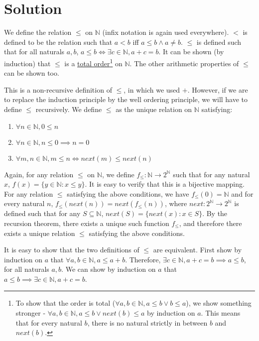 \documentclass[12pt]{report}
\begin{document}
\section*{Solution}
We define the relation $\leq$ on $\mathbb{N}$ (infix notation is again used everywhere). $<$ is defined to be the relation such that $a < b$ iff $a \leq b \land a \neq b$. $\leq$ is defined such that for all naturals $a, b$, $a \leq b \iff \exists c \in \mathbb{N}, a + c = b$. It can be shown (by induction) that $\leq$ is a \href{https://en.wikipedia.org/wiki/Total_order}{total order}\footnote{To show that the order is total ($\forall a, b \in \mathbb{N}, a \leq b \lor b \leq a$), we show something stronger - $\forall a, b \in \mathbb{N}, a \leq b \lor next(b) \leq a$ by induction on $a$. This means that for every natural $b$, there is no natural strictly in between $b$ and $next(b)$.} on $\mathbb{N}$. The other arithmetic properties of $\leq$ can be shown too. 

This is a non-recursive definition of $\leq$, in which we used $+$. However, if we are to replace the induction principle by the well ordering principle, we will have to define $\leq$ recursively. We define $\leq$ as the unique relation on $\mathbb{N}$ satisfying:
\begin{enumerate}
  \item $\forall n \in \mathbb{N}, 0 \leq n$
  \item $\forall n \in \mathbb{N}, n \leq 0 \implies n = 0$
  \item $\forall m, n \in \mathbb{N}, m \leq n \iff next(m) \leq next(n)$
\end{enumerate}
Again, for any relation $\leq$ on $\mathbb{N}$, we define $f_{\leq} : \mathbb{N} \rightarrow 2^{\mathbb{N}}$ such that for any natural $x$, $f(x) = \{y \in \mathbb{N} : x \leq y\}$. It is easy to verify that this is a bijective mapping. For any relation $\leq$ satisfying the above conditions, we have $f_{\leq}(0) = \mathbb{N}$ and for every natural $n$, $f_{\leq}(next(n)) = next(f_{\leq}(n))$, where $next : 2^{\mathbb{N}} \rightarrow 2^{\mathbb{N}}$ is defined such that for any $S \subseteq \mathbb{N}$, $next(S) = \{next(x) : x \in S\}$. By the recursion theorem, there exists a unique such function $f_{\leq}$, and therefore there exists a unique relation $\leq$ satisfying the above conditions. 

It is easy to show that the two definitions of $\leq$ are equivalent. First show by induction on $a$ that $\forall a, b \in \mathbb{N}, a \leq a + b$. Therefore, $\exists c \in \mathbb{N}, a + c = b \implies a \leq b$, for all naturals $a, b$. We can show by induction on $a$ that $a \leq b \implies \exists c \in \mathbb{N}, a + c = b$. 
\end{document}
